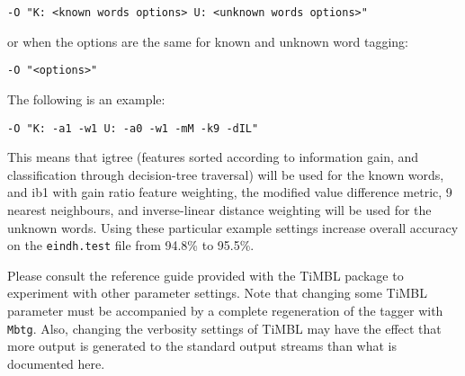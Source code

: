 \documentclass{report}
\begin{document}
{\small
\begin{verbatim}
-O "K: <known words options> U: <unknown words options>" 
\end{verbatim}
}

or when the options are the same for known and unknown word tagging: 

{\small
\begin{verbatim}
-O "<options>"
\end{verbatim}
}

The following is an example: 

{\small
\begin{verbatim}
-O "K: -a1 -w1 U: -a0 -w1 -mM -k9 -dIL" 
\end{verbatim}
}

This means that {\sc igtree} (features sorted according to information
gain, and classification through decision-tree traversal) will be used
for the known words, and {\sc ib1} with gain ratio feature weighting,
the modified value difference metric, 9 nearest neighbours, and
inverse-linear distance weighting will be used for the unknown
words. Using these particular example settings increase
overall accuracy on the {\tt eindh.test} file from 94.8\% to 95.5\%.

Please consult the reference guide provided with the TiMBL
package \cite{Daelemans+07} to experiment with other parameter settings. Note that
changing some TiMBL parameter must be accompanied by a complete
regeneration of the tagger with {\tt Mbtg}. Also, changing the
verbosity settings of TiMBL may have the effect that more output
is generated to the standard output streams than what is documented here.



\end{document}
